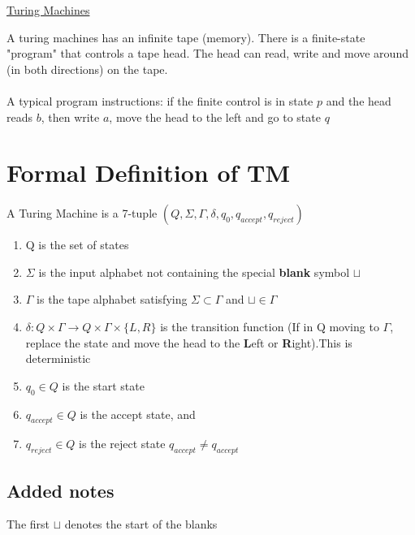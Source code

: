 \documentclass{article}[18pt]
\begin{document}
\begin{center}
\underline{\huge Turing Machines}
\end{center}
A turing machines has an infinite tape (memory). There is a finite-state "program" that controls a tape head. The head can read, write and move around (in both directions) on the tape.\\
\\
A typical program instructions: if the finite control is in state $p$ and the head reads $b$, then write $a$, move the head to the left and go to state $q$
\section{Formal Definition of TM}
A Turing Machine is a 7-tuple $(Q,\Sigma, \Gamma,\delta,q_0,q_{accept},q_{reject})$
\begin{enumerate}
	\item Q is the set of states
	\item $\Sigma$ is the input alphabet not containing the special \textbf{blank} symbol $\sqcup$
	\item $\Gamma$ is the tape alphabet satisfying $\Sigma \subset \Gamma$ and $\sqcup \in \Gamma$
	\item $\delta: Q\times \Gamma \rightarrow Q \times \Gamma \times \{L,R\}$ is the transition function (If in Q moving to $\Gamma$, replace the state and move the head to the \textbf{L}eft or \textbf{R}ight).This is deterministic
	\item $q_0\in Q$ is the start state
	\item $q_{accept} \in Q$ is the accept state, and
	\item $q_{reject}\in Q$ is the reject state $q_{accept}\neq q_{accept}$
\end{enumerate}
\subsection{Added notes}
The first $\sqcup$ denotes the start of the blanks
\end{document}
